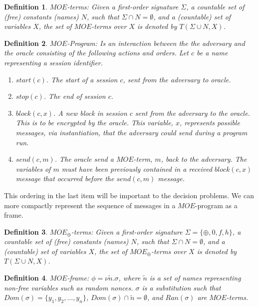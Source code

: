 \documentclass{easychair}
\newtheorem{definition}{Definition}
\begin{document}
\begin{definition}
	$MOE$-terms: Given a first-order signature $\Sigma$, a countable set of (free) constants (names) $N$, such that $\Sigma \cap N =\emptyset$, and a (countable) set of variables $X$, the set of $MOE$-terms over $X$ is denoted by $T(\Sigma \cup N,X)$. 
\end{definition}



\begin{definition}\label{def:moe_program}
	$MOE$-Program: Is an interaction between the 
	the adversary and the oracle consisting of the following actions
	and orders. Let $c$ be a name representing a session identifier.
	\begin{enumerate}
		\item $start(c)$. The start of a session $c$, sent from the
		adversary to oracle.
		\item $stop(c)$. The end of session $c$.
		\item $block(c, x)$. A new block in session $c$ sent from
		the adversary to the oracle. This is to be encrypted by the 
		oracle. This variable, $x$, represents possible messages, via
		instantiation, that the adversary could send during a program
		run. 
		\item $send(c, m)$. The oracle send a $MOE$-term, $m$, back
		to the adversary. The variables of $m$ must have been 
		previously contained in a received $block(c, x)$ message
		that occurred before the $send(c, m)$ message.
	\end{enumerate} 
\end{definition}
This ordering in the last item will be important to the decision 
problems. We can more compactly represent the sequence of messages
in a $MOE$-program as a frame. 

\begin{definition}
	$MOE_{\oplus}$-terms: Given a first-order signature $\Sigma=\{
	\oplus, 0, f, h\}$, a countable set of (free) constants (names) $N$, such that $\Sigma \cap N =\emptyset$, and a (countable) set of variables $X$, the set of $MOE_{\oplus}$-terms over $X$ is denoted by $T(\Sigma \cup N,X)$. 
\end{definition}

\begin{definition}
		$MOE$-frame:  $\phi = \nu \tilde{n}.\sigma$, where
		$\tilde{n}$ is a set of names representing non-free variables such as random nonces. $\sigma$ is a substitution
		such that $Dom(\sigma) = \{ y_1, y_2, \ldots, y_n\}$,
		$Dom(\sigma) \cap \tilde{n} = \emptyset$, and
		$Ran(\sigma)$ are $MOE$-terms.  
\end{definition}
\end{document}
